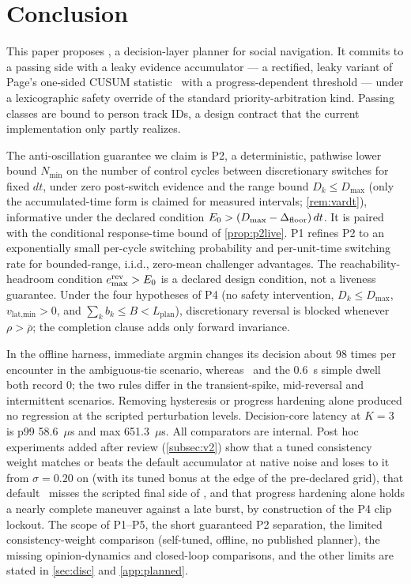 \section{Conclusion}\label{sec:concl}

This paper proposes \sname, a decision-layer planner for social navigation. It commits to a passing side with a leaky evidence accumulator --- a rectified, leaky variant of Page's one-sided CUSUM statistic~\citep{page1954cusum} with a progress-dependent threshold --- under a lexicographic safety override of the standard priority-arbitration kind. Passing classes are bound to person track IDs, a design contract that the current implementation only partly realizes.

The anti-oscillation guarantee we claim is P2, a deterministic, pathwise lower bound $N_{\min}$ on the number of control cycles between discretionary switches for fixed $dt$, under zero post-switch evidence and the range bound $D_k\le D_{\max}$ (only the accumulated-time form is claimed for measured intervals; \cref{rem:vardt}), informative under the declared condition $E_0 > (D_{\max}-\Delta_{\text{floor}})\,dt$. It is paired with the conditional response-time bound of \cref{prop:p2live}. P1 refines P2 to an exponentially small per-cycle switching probability and per-unit-time switching rate for bounded-range, i.i.d., zero-mean challenger advantages. The reachability-headroom condition $e^{\text{rev}}_{\max} > E_0$ is a declared design condition, not a liveness guarantee. Under the four hypotheses of P4 (no safety intervention, $D_k\le D_{\max}$, $v_{\text{lat,min}}>0$, and $\sum_k b_k\le B<L_{\text{plan}}$), discretionary reversal is blocked whenever $\rho>\bar\rho$; the completion clause adds only forward invariance.

In the offline harness, immediate argmin changes its decision about 98 times per encounter in the ambiguous-tie scenario, whereas \sname\ and the 0.6~s simple dwell both record 0; the two rules differ in the transient-spike, mid-reversal and intermittent scenarios. Removing hysteresis or progress hardening alone produced no regression at the scripted perturbation levels. Decision-core latency at $K=3$ is p99 58.6~$\mu$s and max 651.3~$\mu$s. All comparators are internal. Post hoc experiments added after review (\cref{subsec:v2}) show that a tuned consistency weight matches or beats the default accumulator at native noise and loses to it from $\sigma=0.20$ on (with its tuned bonus at the edge of the pre-declared grid), that default \sname\ misses the scripted final side of , and that progress hardening alone holds a nearly complete maneuver against a late burst, by construction of the P4 clip lockout. The scope of P1--P5, the short guaranteed P2 separation, the limited consistency-weight comparison (self-tuned, offline, no published planner), the missing opinion-dynamics and closed-loop comparisons, and the other limits are stated in \cref{sec:disc} and \cref{app:planned}.

